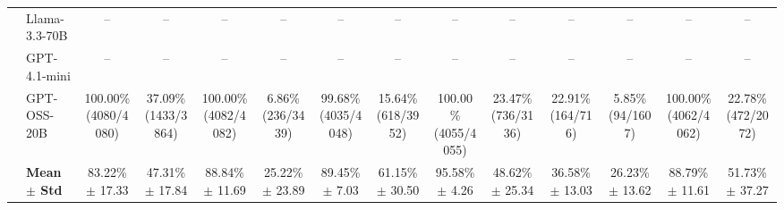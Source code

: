 \begin{table}[t]
{\begin{tabular}{ll*{12}{c}}
 & Llama-3.3-70B & -- & -- & -- & -- & -- & -- & -- & -- & -- & -- & -- & -- \\
 & GPT-4.1-mini & -- & -- & -- & -- & -- & -- & -- & -- & -- & -- & -- & -- \\
 & GPT-OSS-20B & \makecell[c]{100.00\%\\[-1pt]\scriptsize(4080/4080)} & \makecell[c]{37.09\%\\[-1pt]\scriptsize(1433/3864)} & \makecell[c]{100.00\%\\[-1pt]\scriptsize(4082/4082)} & \makecell[c]{6.86\%\\[-1pt]\scriptsize(236/3439)} & \makecell[c]{99.68\%\\[-1pt]\scriptsize(4035/4048)} & \makecell[c]{15.64\%\\[-1pt]\scriptsize(618/3952)} & \makecell[c]{100.00\%\\[-1pt]\scriptsize(4055/4055)} & \makecell[c]{23.47\%\\[-1pt]\scriptsize(736/3136)} & \makecell[c]{22.91\%\\[-1pt]\scriptsize(164/716)} & \makecell[c]{5.85\%\\[-1pt]\scriptsize(94/1607)} & \makecell[c]{100.00\%\\[-1pt]\scriptsize(4062/4062)} & \makecell[c]{22.78\%\\[-1pt]\scriptsize(472/2072)} \\
\midrule
 & \textbf{Mean $\pm$ Std} & 83.22\% $\pm$ 17.33 & 47.31\% $\pm$ 17.84 & 88.84\% $\pm$ 11.69 & 25.22\% $\pm$ 23.89 & 89.45\% $\pm$ 7.03 & 61.15\% $\pm$ 30.50 & 95.58\% $\pm$ 4.26 & 48.62\% $\pm$ 25.34 & 36.58\% $\pm$ 13.03 & 26.23\% $\pm$ 13.62 & 88.79\% $\pm$ 11.61 & 51.73\% $\pm$ 37.27 \\
\bottomrule
\end{tabular}
}
\end{table}
